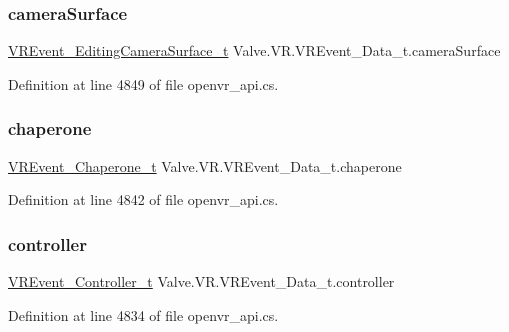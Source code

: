 \subsubsection{\texorpdfstring{cameraSurface}{cameraSurface}}
{\footnotesize\ttfamily \mbox{\hyperlink{struct_valve_1_1_v_r_1_1_v_r_event___editing_camera_surface__t}{V\+R\+Event\+\_\+\+Editing\+Camera\+Surface\+\_\+t}} Valve.\+V\+R.\+V\+R\+Event\+\_\+\+Data\+\_\+t.\+camera\+Surface}



Definition at line 4849 of file openvr\+\_\+api.\+cs.

\mbox{\label{struct_valve_1_1_v_r_1_1_v_r_event___data__t_ab118266b879e1ae93c886642474e71b2}} 
\subsubsection{\texorpdfstring{chaperone}{chaperone}}
{\footnotesize\ttfamily \mbox{\hyperlink{struct_valve_1_1_v_r_1_1_v_r_event___chaperone__t}{V\+R\+Event\+\_\+\+Chaperone\+\_\+t}} Valve.\+V\+R.\+V\+R\+Event\+\_\+\+Data\+\_\+t.\+chaperone}



Definition at line 4842 of file openvr\+\_\+api.\+cs.

\mbox{\label{struct_valve_1_1_v_r_1_1_v_r_event___data__t_a3f176cf4ef3de2085f0b1a0bf7549af1}} 
\subsubsection{\texorpdfstring{controller}{controller}}
{\footnotesize\ttfamily \mbox{\hyperlink{struct_valve_1_1_v_r_1_1_v_r_event___controller__t}{V\+R\+Event\+\_\+\+Controller\+\_\+t}} Valve.\+V\+R.\+V\+R\+Event\+\_\+\+Data\+\_\+t.\+controller}



Definition at line 4834 of file openvr\+\_\+api.\+cs.

\mbox{\label{struct_valve_1_1_v_r_1_1_v_r_event___data__t_abdd8dd35a96c26741c9f48dc0d26a176}} 
